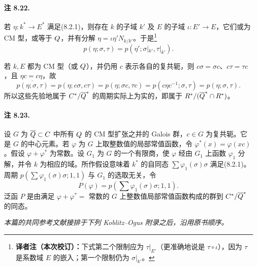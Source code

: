 \paragraph*{注 8.22.}
若 $\eta:k^*\longrightarrow E^*$ 满足(8.2.1)，则存在 $k$ 的子域 $k'$ 及 $E$ 的子域 $\iota:E'\longrightarrow E$，它们或为 CM 型，或等于 $Q$，并有分解 $\eta=\iota\eta'N_{k/k'}$。于是\footnote{\textbf{译者注（本次校订）：}下式第二个限制应为 $\tau|_{E'}$（更准确地说是 $\tau\circ\iota$），因为 $\tau$ 是系数域 $E$ 的嵌入；第一个限制仍为 $\sigma|_{k'}$。}
\[
 p(\eta;\sigma,\tau)=p(\eta';\sigma|_{k'},\tau|_{k'}).
\]

若 $k,E$ 都为 CM 型（或 $Q$），并仍用 $c$ 表示各自的复共轭，则 $c\sigma=\sigma c$、$c\tau=\tau c$，且 $\eta c=c\eta$，故
\[
 \overline{p(\eta;\sigma,\tau)}
 =p(\eta;c\sigma,c\tau)=p(\eta;\sigma c,\tau c)
 =p(c\eta c^{-1};\sigma,\tau)=p(\eta;\sigma,\tau).
\]
所以这些先验地属于 $C^*/\overline{Q}^*$ 的周期实际上为实的，即属于
$R^*/(\overline{Q}^*\cap R^*)$。

\paragraph*{注 8.23.}
设 $G$ 为 $\overline{Q}\subset C$ 中所有 $Q$ 的 CM 型扩张之并的 Galois 群，$c\in G$ 为复共轭。它是 $G$ 的中心元素。若 $\varphi$ 为 $G$ 上取整数值的局部常值函数，令 $\varphi^*(x)=\varphi(xc)$。假设 $\varphi+\varphi^*$ 为常数。设 $G_1$ 为 $G$ 的一个有限商，使 $\varphi$ 经由 $G_1$ 上函数 $\varphi_1$ 分解，并令 $k$ 为相应的域。所作假设意味着 $k^*$ 的自同态 $\sum\varphi_1(\sigma)\sigma$ 满足(8.2.1)。周期
$p(\sum\varphi_1(\sigma)\sigma;1,1)$ 与 $G_1$ 的选取无关，令
\[
 P(\varphi)=p\left(\sum\varphi_1(\sigma)\sigma;1,1\right).
\]
泛函 $P$ 是由满足 $\varphi+\varphi^*=$ 常数的 $G$ 上整数值局部常值函数构成的群到 $C^*/\overline{Q}^*$ 的同态。

\medskip
\noindent\textit{本篇的共同参考文献接排于下列 Koblitz--Ogus 附录之后，沿用原书顺序。}
